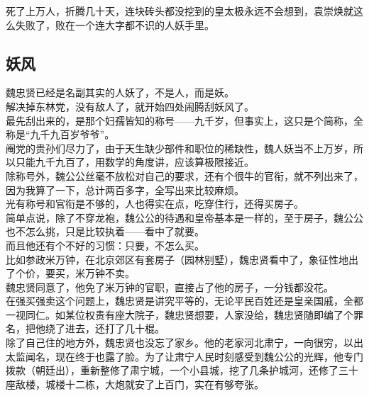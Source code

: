 \begin{multicols}{\theparacolNo}
死了上万人，折腾几十天，连块砖头都没挖到的皇太极永远不会想到，袁崇焕就这么失败了，败在一个连大字都不识的人妖手里。\\

\subsection{妖风}
魏忠贤已经是名副其实的人妖了，不是人，而是妖。\\

解决掉东林党，没有敌人了，就开始四处闹腾刮妖风了。\\

最先刮出来的，是那个妇孺皆知的称号——九千岁，但事实上，这只是个简称，全称是“九千九百岁爷爷”。\\

阉党的贵孙们尽力了，由于天生缺少部件和职位的稀缺性，魏人妖当不上万岁，所以只能九千九百了，用数学的角度讲，应该算极限接近。\\

除称号外，魏公公丝毫不放松对自己的要求，还有个很牛的官衔，就不列出来了，因为我算了一下，总计两百多字，全写出来比较麻烦。\\

光有称号和官衔是不够的，人也得实在点，吃穿住行，还得买房子。\\

简单点说，除了不穿龙袍，魏公公的待遇和皇帝基本是一样的，至于房子，魏公公也不怎么挑，只是比较执着——看中了就要。\\

而且他还有个不好的习惯：只要，不怎么买。\\

比如参政米万钟，在北京郊区有套房子（园林别墅），魏忠贤看中了，象征性地出了个价，要买，米万钟不卖。\\

魏忠贤同意了，他免了米万钟的官职，直接占了他的房子，一分钱都没花。\\

在强买强卖这个问题上，魏忠贤是讲究平等的，无论平民百姓还是皇亲国戚，全都一视同仁。如某位权贵有座大院子，魏忠贤想要，人家没给，魏忠贤随即编了个罪名，把他绕了进去，还打了几十棍。\\

除了自己住的地方外，魏忠贤也没忘了家乡。他的老家河北肃宁，一向很穷，以出太监闻名，现在终于也露了脸。为了让肃宁人民时刻感受到魏公公的光辉，他专门拨款（朝廷出），重新整修了肃宁城，一个小县城，挖了几条护城河，还修了三十座敌楼，城楼十二栋，大炮就安了上百门，实在有够夸张。\\


\end{multicols}
